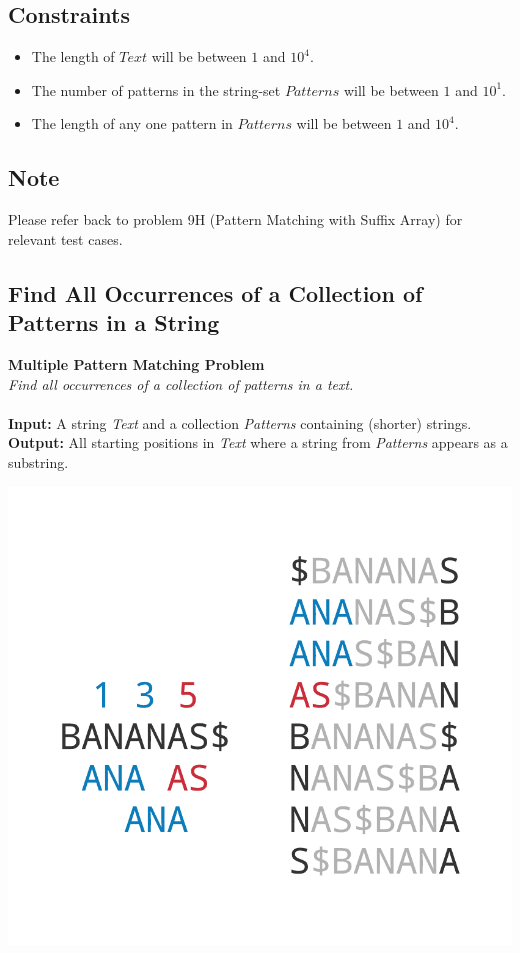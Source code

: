 \documentclass{article}
\begin{document}
\subsection*{Constraints}
\begin{itemize}
    \item The length of $Text$ will be between $1$ and $10^4$.
    \item The number of patterns in the string-set $Patterns$ will be between $1$ and $10^1$.
    \item The length of any one pattern in $Patterns$ will be between $1$ and $10^4$.
\end{itemize}

\subsection*{Note}
Please refer back to problem 9H (Pattern Matching with Suffix Array) for relevant test cases.
\pagebreak
\subsection{Find All Occurrences of a Collection of Patterns in a String}
\hline\vspace{5}
\noindent \textbf{Multiple Pattern Matching Problem} \\
\emph{Find all occurrences of a collection of patterns in a text.}\\ \\
\textbf{Input:} A string \emph{Text} and a collection \emph{Patterns} containing (shorter) strings. \\
\textbf{Output:} All starting positions in \emph{Text} where a string from \emph{Patterns} appears as a substring.
\begin{center}
    \includegraphics[scale=0.2]{logos/9LMN.png} 
\end{center}
\hline\vspace{5}
\end{document}
